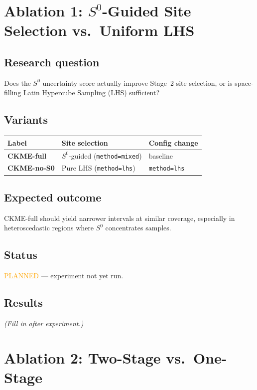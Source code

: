 \documentclass[11pt]{article}
\begin{document}
\section{Ablation 1: $S^0$-Guided Site Selection vs.\ Uniform LHS}
\label{sec:abl1}

\subsection*{Research question}
Does the $S^0$ uncertainty score actually improve Stage~2 site selection,
or is space-filling Latin Hypercube Sampling (LHS) sufficient?

\subsection*{Variants}

\begin{center}
\begin{tabular}{lll}
  \toprule
  Label & Site selection & Config change \\
  \midrule
  \textbf{CKME-full} & $S^0$-guided (\texttt{method=mixed}) & baseline \\
  \textbf{CKME-no-S0} & Pure LHS (\texttt{method=lhs}) & \texttt{method=lhs} \\
  \bottomrule
\end{tabular}
\end{center}

\subsection*{Expected outcome}
CKME-full should yield narrower intervals at similar coverage,
especially in heteroscedastic regions where $S^0$ concentrates samples.

\subsection*{Status}
\textcolor{orange}{PLANNED} --- experiment not yet run.

\subsection*{Results}
\textit{(Fill in after experiment.)}

\section{Ablation 2: Two-Stage vs.\ One-Stage}
\label{sec:abl2}
\end{document}
